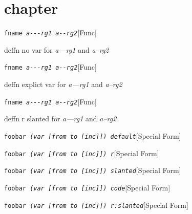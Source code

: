 \documentclass{book}
\begin{document}
\label{anchor:Top}%
\chapter{chapter}
\label{anchor:chapter}%

\noindent\texttt{fname \EmbracOn{}\textsl{a{-}{-}{-}rg1 a{-}{-}rg2}}\hfill[Func]



%
deffn no var for \textsl{a---rg1} and \textsl{a--rg2}

\noindent\texttt{fname \EmbracOn{}\textsl{\EmbracOff{}\textsl{a{-}{-}{-}rg1}\EmbracOn{} \EmbracOff{}\textsl{a{-}{-}rg2}\EmbracOn{}}}\hfill[Func]



%
deffn explict var for \textsl{a---rg1} and \textsl{a--rg2}

\noindent\texttt{fname \EmbracOn{}\textsl{\EmbracOff{}\textnormal{\textsl{a{-}{-}{-}rg1}}\EmbracOn{} \EmbracOff{}\textnormal{\textsl{a{-}{-}rg2}}\EmbracOn{}}}\hfill[Func]



%
deffn r slanted for \textsl{a---rg1} and \textsl{a--rg2}

\noindent\texttt{foobar \EmbracOn{}\textsl{(var [from to [inc]]) default}}\hfill[Special Form]



%
\noindent\texttt{foobar \EmbracOn{}\textsl{(var \EmbracOff{}\textnormal{[}\EmbracOn{}from to \EmbracOff{}\textnormal{[}\EmbracOn{}inc\EmbracOff{}\textnormal{]]}\EmbracOn{}) r}}\hfill[Special Form]



%
\noindent\texttt{foobar \EmbracOn{}\textsl{(var \EmbracOff{}\textsl{[}\EmbracOn{}from to \EmbracOff{}\textsl{[}\EmbracOn{}inc\EmbracOff{}\textsl{]]}\EmbracOn{}) slanted}}\hfill[Special Form]



%
\noindent\texttt{foobar \EmbracOn{}\textsl{(var \EmbracOff{}\texttt{[}\EmbracOn{}from to \EmbracOff{}\texttt{[}\EmbracOn{}inc\EmbracOff{}\texttt{]]}\EmbracOn{}) code}}\hfill[Special Form]



%
\noindent\texttt{foobar \EmbracOn{}\textsl{(var \EmbracOff{}\textnormal{\textsl{[}}\EmbracOn{}from to \EmbracOff{}\textnormal{\textsl{[}}\EmbracOn{}inc\EmbracOff{}\textnormal{\textsl{]]}}\EmbracOn{}) r:slanted}}\hfill[Special Form]
\end{document}
